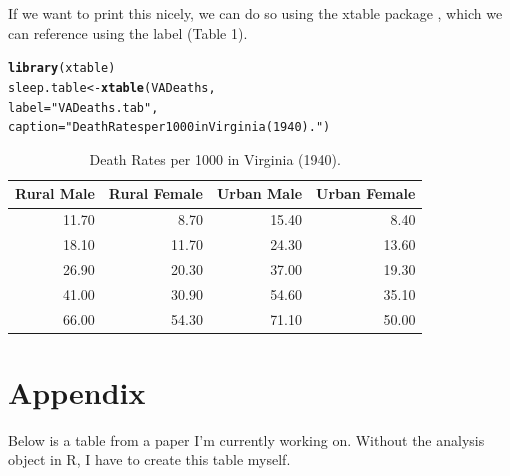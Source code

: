 \documentclass{article}\usepackage[]{graphicx}\usepackage[]{xcolor}
\makeatletter
\newcommand{\hlsng}[1]{\textcolor[rgb]{0.192,0.494,0.8}{#1}}%
\newcommand{\hldef}[1]{\textcolor[rgb]{0.345,0.345,0.345}{#1}}%
\newcommand{\hlkwb}[1]{\textcolor[rgb]{0.69,0.353,0.396}{#1}}%
\newcommand{\hlkwc}[1]{\textcolor[rgb]{0.333,0.667,0.333}{#1}}%
\newcommand{\hlkwd}[1]{\textcolor[rgb]{0.737,0.353,0.396}{\textbf{#1}}}%
\newenvironment{kframe}{%
 \def\at@end@of@kframe{}%
 \ifinner\ifhmode%
  \def\at@end@of@kframe{\end{minipage}}%
  \begin{minipage}{\columnwidth}%
 \fi\fi%
 \def\FrameCommand##1{\hskip\@totalleftmargin \hskip-\fboxsep
 \colorbox{shadecolor}{##1}\hskip-\fboxsep
     \hskip-\linewidth \hskip-\@totalleftmargin \hskip\columnwidth}%
 \MakeFramed {\advance\hsize-\width
   \@totalleftmargin\z@ \linewidth\hsize
   \@setminipage}}%
 {\par\unskip\endMakeFramed%
 \at@end@of@kframe}
\newenvironment{knitrout}{}{} %
\makeatother
\begin{document}
\begin{multicols}{2}
 If we want to print this nicely, we can do so using the
 xtable package \citep{xtable}, which we can reference
 using the label (Table 1).
 
\begin{knitrout}
\color{fgcolor}\begin{kframe}
\begin{alltt}
\hlkwd{library}\hldef{(xtable)}
\hldef{sleep.table}\hlkwb{<-}\hlkwd{xtable}\hldef{(VADeaths,}
    \hlkwc{label}\hldef{=}\hlsng{"VADeaths.tab"}\hldef{,}
    \hlkwc{caption}\hldef{=}\hlsng{"Death Rates per 1000 in Virginia (1940)."}\hldef{)}
\end{alltt}
\end{kframe}
\end{knitrout}
 
\begin{table}[H]
\centering
\begingroup\small
\begin{tabular}{rrrr}
  \hline
Rural Male & Rural Female & Urban Male & Urban Female \\ 
  \hline
11.70 & 8.70 & 15.40 & 8.40 \\ 
  18.10 & 11.70 & 24.30 & 13.60 \\ 
  26.90 & 20.30 & 37.00 & 19.30 \\ 
  41.00 & 30.90 & 54.60 & 35.10 \\ 
  66.00 & 54.30 & 71.10 & 50.00 \\ 
   \hline
\end{tabular}
\endgroup
\caption{Death Rates per 1000 in Virginia (1940).} 
\label{VADeaths.tab}
\end{table}


\begin{tiny}

\end{tiny}

\pagebreak

\end{multicols}

\section{Appendix}
 Below is a table from a paper I’m currently working on. Without the analysis object in R, I have to create this table myself.
\end{document}
